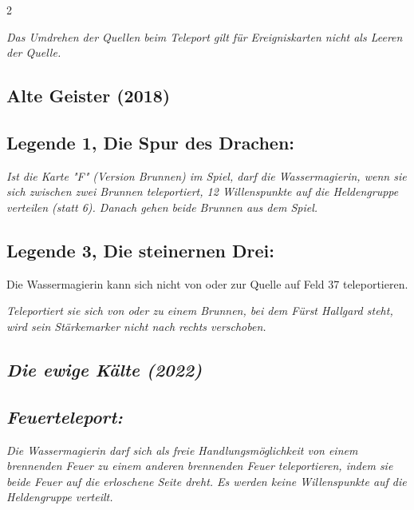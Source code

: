 \documentclass[10pt, a4paper, oneside]{book}
\newcommand{\fan}[1]{\textit{#1}}
\begin{document}
\begin{multicols*}{2}
\begin{bgcolor}
\fan{Das Umdrehen der Quellen beim Teleport gilt für Ereigniskarten nicht als Leeren der Quelle.}



\end{bgcolor}





\begin{bgcolor}[color-AG]
\section{Alte Geister (2018)}


\subsection{Legende 1, Die Spur des Drachen:}

\fan{Ist die Karte "F" (Version Brunnen) im Spiel, darf die Wassermagierin, wenn sie sich zwischen zwei Brunnen teleportiert, 12 Willenspunkte auf die Heldengruppe verteilen (statt 6). Danach gehen beide Brunnen aus dem Spiel.}



\subsection{Legende 3, Die steinernen Drei:}

Die Wassermagierin kann sich nicht von oder zur Quelle auf Feld 37 teleportieren.
\supercite{AG:Begleitheft}

\fan{Teleportiert sie sich von oder zu einem Brunnen, bei dem Fürst Hallgard steht, wird sein Stärkemarker nicht nach rechts verschoben.}



\end{bgcolor}





\begin{bgcolor}
\section{\fan{Die ewige Kälte (2022)}}

\subsection{\fan{Feuerteleport:}}

\fan{Die Wassermagierin darf sich als freie Handlungsmöglichkeit von einem brennenden Feuer zu einem anderen brennenden Feuer teleportieren, indem sie beide Feuer auf die erloschene Seite dreht. Es werden keine Willenspunkte auf die Heldengruppe verteilt.} 


\end{bgcolor}
\end{multicols*}
\end{document}
